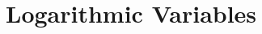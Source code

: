 \documentclass[../main]{subfiles}
\begin{document}
  \chapter{Logarithmic Variables}\label{appendix:variables}
  
\end{document}
